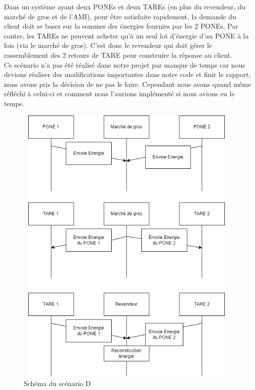 Dans un système ayant deux PONEs et deux TAREs (en plus du revendeur, du marché de gros et de l'AMI), pour être satisfaite rapidement, la demande du client doit se baser sur la sommes des énergies fournies par les 2 PONEs. Par contre, les TAREs ne peuvent acheter qu'à un seul lot d'énergie d'un PONE à la fois (via le marché de gros). C'est donc le revendeur qui doit gérer le rassemblement des 2 retours de TARE pour construire la réponse au client.
\\[1cm]
Ce scénario n'a pas été réalisé dans notre projet par manque de temps car nous devions réaliser des modifications importantes dans notre code et finir le rapport, nous avons pris la décision de ne pas le faire.
Cependant nous avons quand même réfléchi à celui-ci et comment nous l'aurions implémenté si nous avions eu le temps.

\begin{figure}[h]
    \centering
    \includegraphics[width=110mm, height=140mm]{images/ScenarioD.png}
    \caption{Schéma du scénario D}
    \label{img:mesh25}
\end{figure}
\newpage